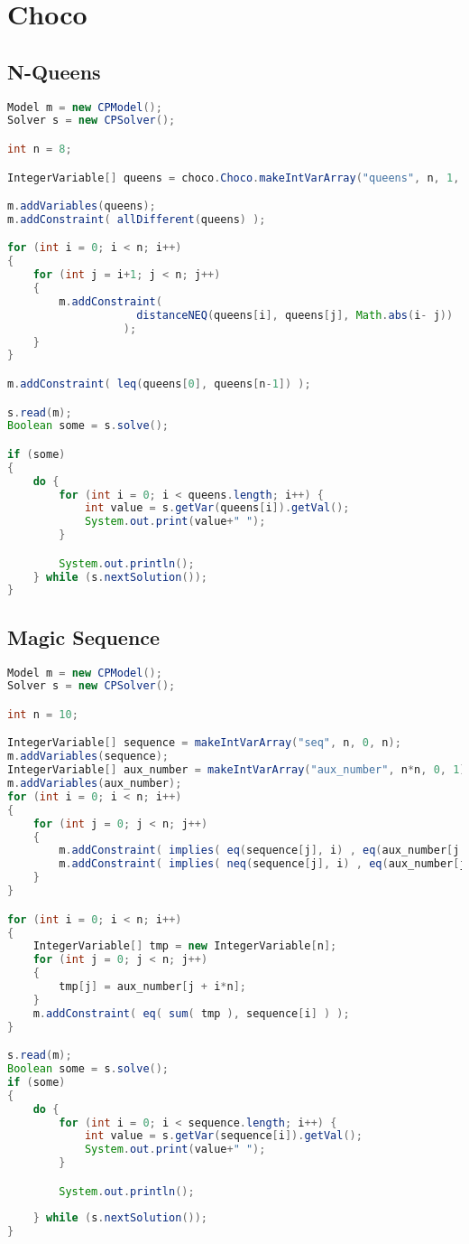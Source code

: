 \section{Choco}
\label{implementation:choco}

\subsection{N-Queens}
\begin{lstlisting}[language=Java]
Model m = new CPModel();
Solver s = new CPSolver();

int n = 8;

IntegerVariable[] queens = choco.Choco.makeIntVarArray("queens", n, 1, n);

m.addVariables(queens);
m.addConstraint( allDifferent(queens) );

for (int i = 0; i < n; i++)
{
    for (int j = i+1; j < n; j++)
    {
        m.addConstraint(
                    distanceNEQ(queens[i], queens[j], Math.abs(i- j))
                  );
    }
}

m.addConstraint( leq(queens[0], queens[n-1]) );

s.read(m);
Boolean some = s.solve();

if (some)
{
    do {
        for (int i = 0; i < queens.length; i++) {
            int value = s.getVar(queens[i]).getVal();
            System.out.print(value+" ");
        }

        System.out.println();
    } while (s.nextSolution());
}
\end{lstlisting}

\subsection{Magic Sequence}
\begin{lstlisting}[language=Java]
Model m = new CPModel();
Solver s = new CPSolver();

int n = 10;

IntegerVariable[] sequence = makeIntVarArray("seq", n, 0, n);
m.addVariables(sequence);
IntegerVariable[] aux_number = makeIntVarArray("aux_number", n*n, 0, 1);
m.addVariables(aux_number);
for (int i = 0; i < n; i++)
{
    for (int j = 0; j < n; j++)
    {
        m.addConstraint( implies( eq(sequence[j], i) , eq(aux_number[j + i*n], 1) ) );
        m.addConstraint( implies( neq(sequence[j], i) , eq(aux_number[j + i*n], 0) ) );
    }
}

for (int i = 0; i < n; i++)
{
    IntegerVariable[] tmp = new IntegerVariable[n];
    for (int j = 0; j < n; j++)
    {
        tmp[j] = aux_number[j + i*n];
    }
    m.addConstraint( eq( sum( tmp ), sequence[i] ) );
}

s.read(m);
Boolean some = s.solve();
if (some)
{
    do {
        for (int i = 0; i < sequence.length; i++) {
            int value = s.getVar(sequence[i]).getVal();
            System.out.print(value+" ");
        }

        System.out.println();
        
    } while (s.nextSolution());
}
\end{lstlisting}


